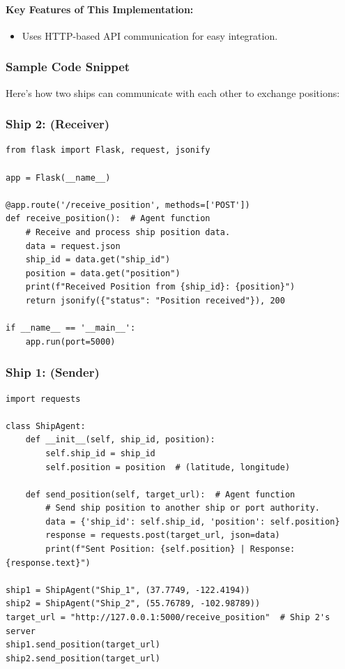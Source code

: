 \documentclass{article}
\begin{document}
\paragraph{Key Features of This Implementation:}
\begin{itemize}
    \item Uses HTTP-based API communication for easy integration.
\end{itemize}

\subsubsection{Sample Code Snippet}

Here’s how two ships can communicate with each other to exchange positions:

\subsubsection{Ship 2: (Receiver)}

\begin{verbatim}
from flask import Flask, request, jsonify

app = Flask(__name__)

@app.route('/receive_position', methods=['POST'])
def receive_position():  # Agent function
    # Receive and process ship position data.
    data = request.json
    ship_id = data.get("ship_id")
    position = data.get("position")
    print(f"Received Position from {ship_id}: {position}")
    return jsonify({"status": "Position received"}), 200

if __name__ == '__main__':
    app.run(port=5000)
\end{verbatim}

\subsubsection{Ship 1: (Sender)}

\begin{verbatim}
import requests

class ShipAgent:
    def __init__(self, ship_id, position):
        self.ship_id = ship_id
        self.position = position  # (latitude, longitude)

    def send_position(self, target_url):  # Agent function
        # Send ship position to another ship or port authority.
        data = {'ship_id': self.ship_id, 'position': self.position}
        response = requests.post(target_url, json=data)
        print(f"Sent Position: {self.position} | Response: {response.text}")

ship1 = ShipAgent("Ship_1", (37.7749, -122.4194))
ship2 = ShipAgent("Ship_2", (55.76789, -102.98789))
target_url = "http://127.0.0.1:5000/receive_position"  # Ship 2's server
ship1.send_position(target_url)
ship2.send_position(target_url)
\end{verbatim}
\end{document}
